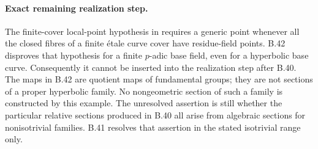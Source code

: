 \paragraph{Exact remaining realization step.}
The finite-cover local-point hypothesis in
\cite[Definition 0.2(vi)]{B_SaidiFunctionFields}
requires a generic point whenever all the
closed fibres of a finite \'etale curve cover
have residue-field points. B.42 disproves
that hypothesis for a finite $p$-adic base
field, even for a hyperbolic base curve.
Consequently it cannot be inserted into
the realization step after B.40.
The maps in B.42 are quotient maps of
fundamental groups; they are not sections
of a proper hyperbolic family. No
nongeometric section of such a family is
constructed by this example.
The unresolved assertion is still whether
the particular relative sections produced
in B.40 all arise from algebraic sections
for nonisotrivial families. B.41 resolves
that assertion in the stated isotrivial
range only.
